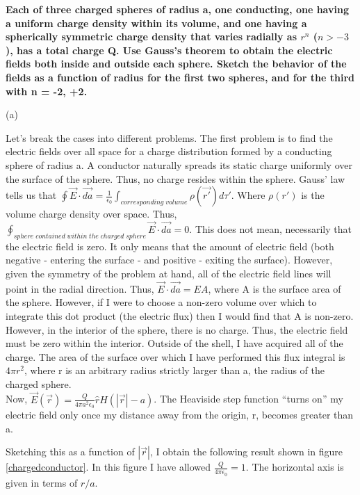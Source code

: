 \begin{homeworkProblem}

\textbf{Each of three charged spheres of radius a, one conducting, one having a uniform 
charge density within its volume, and one having a spherically symmetric charge 
density that varies radially as $r^n$ ($n> -3$), has a total charge Q. Use Gauss's theorem 
to obtain the electric fields both inside and outside each sphere. Sketch the behavior 
of the fields as a function of radius for the first two spheres, and for the third with 
n = -2, +2. }

\begin{homeworkSection}{(a)}

Let's break the cases into different problems. The first problem is to find the electric fields over all space for a charge distribution formed by a conducting sphere of radius a. A conductor naturally spreads its static charge uniformly over the surface of the sphere. Thus, no charge resides within the sphere. Gauss' law tells us that $\oint \vec{E}\cdot \vec{da} = \frac{1}{\epsilon_0} \int_{corresponding\;volume} \rho(\vec{r'})d\tau'$. Where $\rho(r')$ is the volume charge density over space. Thus, $\oint_{sphere\;contained\;within\;the\;charged\;sphere} \vec{E} \cdot \vec{da} = 0$. This does not mean, necessarily that the electric field is zero. It only means that the amount of electric field (both negative - entering the surface - and positive - exiting the surface). However, given the symmetry of the problem at hand, all of the electric field lines will point in the radial direction. Thus, $\vec{E}\cdot \vec{da} = E A$, where A is the surface area of the sphere. However, if I were to choose a non-zero volume over which to integrate this dot product (the electric flux) then I would find that A is non-zero. However, in the interior of the sphere, there is no charge. Thus, the electric field must be zero within the interior. Outside of the shell, I have acquired all of the charge. The area of the surface over which I have performed this flux integral is $4\pi r^2$, where r is an arbitrary radius strictly larger than a, the radius of the charged sphere.
\\
Now, $\vec{E}(\vec{r})= \frac{Q}{4\pi a^2 \epsilon_0} \hat{r} H(|\vec{r}|-a)$. The Heaviside step function ``turns on'' my electric field only once my distance away from the origin, r, becomes greater than a.

Sketching this as a function of $|\vec{r}|$, I obtain the following result shown in figure \ref{chargedconductor}. In this figure I have allowed $\frac{Q}{4\pi \epsilon_0} = 1$. The horizontal axis is given in terms of $r/a$.


\end{homeworkSection}
\end{homeworkProblem}
